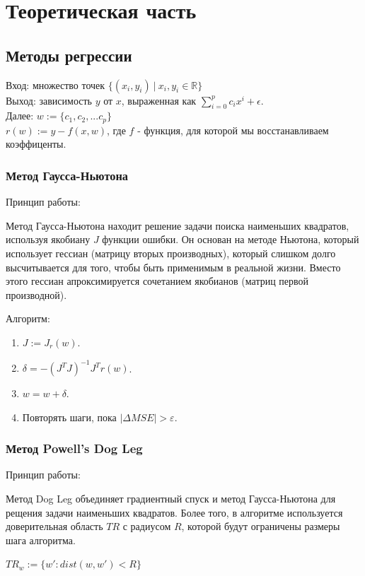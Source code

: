 \documentclass[a4paper,14pt,oneside,openany]{memoir}
\begin{document}
\chapter{Теоретическая часть}
\section{Методы регрессии}
Вход: множество точек $\{(x_i, y_i)\ |\ x_i, y_i \in \mathbb{R}\}$\\
Выход: зависимость $y$ от $x$, выраженная как $\sum_{i=0}^{p} c_ix^i + \epsilon.$ \\
Далее:
$w := \{c_1, c_2, ... c_p\}$ \\
$r(w) := y - f(x, w)$, где $f$ - функция, для которой мы восстанавливаем коэффиценты.

\subsection{Метод Гаусса-Ньютона}

Принцип работы: 

Метод Гаусса-Ньютона находит решение задачи поиска наименьших квадратов, используя якобиану $J$ функции ошибки. Он основан на методе Ньютона, который использует гессиан (матрицу вторых производных), который слишком долго высчитывается для того, чтобы быть применимым в реальной жизни. Вместо этого гессиан апроксимируется сочетанием якобианов (матриц первой производной).

Алгоритм:
\begin{enumerate}
	\item $J := J_r(w)$.
	\item $\delta = -(J^TJ)^{-1}J^Tr(w)$.
	\item $w = w + \delta$.
	\item Повторять шаги, пока $|\Delta MSE| > \varepsilon$.
\end{enumerate}

\subsection{Метод Powell's Dog Leg}

Принцип работы: 

Метод Dog Leg объединяет градиентный спуск и метод Гаусса-Ньютона для рещения задачи наименьших квадратов. Более того, в алгоритме используется доверительная область $TR$ с радиусом $R$, которой будут ограничены размеры шага алгоритма. 

$TR_w := \{w': dist(w, w') < R\}$
\end{document}

